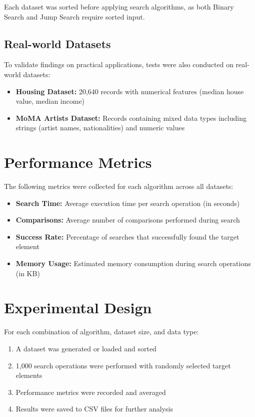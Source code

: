 Each dataset was sorted before applying search algorithms, as both Binary Search and Jump Search require sorted input.

\subsection{Real-world Datasets}
To validate findings on practical applications, tests were also conducted on real-world datasets:
\begin{itemize}
    \item \textbf{Housing Dataset:} 20,640 records with numerical features (median house value, median income)
    \item \textbf{MoMA Artists Dataset:} Records containing mixed data types including strings (artist names, nationalities) and numeric values
\end{itemize}

\section{Performance Metrics}

The following metrics were collected for each algorithm across all datasets:

\begin{itemize}
    \item \textbf{Search Time:} Average execution time per search operation (in seconds)
    \item \textbf{Comparisons:} Average number of comparisons performed during search
    \item \textbf{Success Rate:} Percentage of searches that successfully found the target element
    \item \textbf{Memory Usage:} Estimated memory consumption during search operations (in KB)
\end{itemize}

\section{Experimental Design}

For each combination of algorithm, dataset size, and data type:

\begin{enumerate}
    \item A dataset was generated or loaded and sorted
    \item 1,000 search operations were performed with randomly selected target elements
    \item Performance metrics were recorded and averaged
    \item Results were saved to CSV files for further analysis
\end{enumerate}

